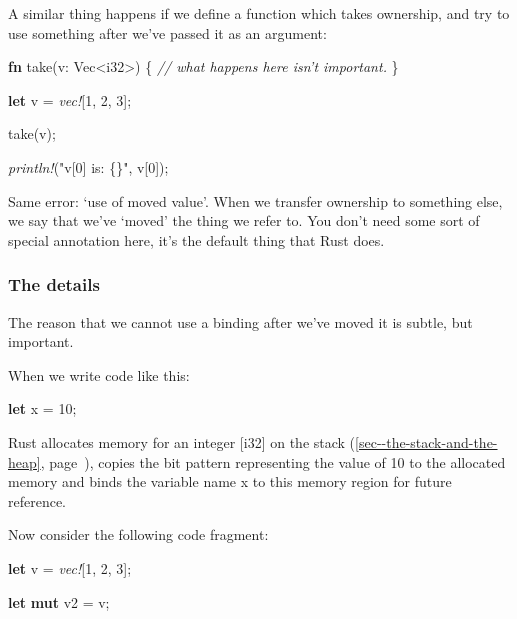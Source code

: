 \documentclass[a4paper,]{book}
\renewcommand*{\hyperlink}[2]{%
 #2 (\autoref{#1}, page~\pageref{#1})}
\newenvironment{Shaded}{\begin{snugshade}}{\end{snugshade}}
\newcommand{\KeywordTok}[1]{\textcolor[rgb]{0.13,0.29,0.53}{\textbf{{#1}}}}
\newcommand{\DataTypeTok}[1]{\textcolor[rgb]{0.13,0.29,0.53}{{#1}}}
\newcommand{\DecValTok}[1]{\textcolor[rgb]{0.00,0.00,0.81}{{#1}}}
\newcommand{\StringTok}[1]{\textcolor[rgb]{0.31,0.60,0.02}{{#1}}}
\newcommand{\CommentTok}[1]{\textcolor[rgb]{0.56,0.35,0.01}{\textit{{#1}}}}
\newcommand{\PreprocessorTok}[1]{\textcolor[rgb]{0.56,0.35,0.01}{\textit{{#1}}}}
\newcommand{\NormalTok}[1]{{#1}}
\begin{document}
A similar thing happens if we define a function which takes ownership,
and try to use something after we've passed it as an argument:

\begin{Shaded}
\begin{Highlighting}[]
\KeywordTok{fn} \NormalTok{take(v: }\DataTypeTok{Vec}\NormalTok{<}\DataTypeTok{i32}\NormalTok{>) \{}
    \CommentTok{// what happens here isn’t important.}
\NormalTok{\}}

\KeywordTok{let} \NormalTok{v = }\PreprocessorTok{vec!}\NormalTok{[}\DecValTok{1}\NormalTok{, }\DecValTok{2}\NormalTok{, }\DecValTok{3}\NormalTok{];}

\NormalTok{take(v);}

\PreprocessorTok{println!}\NormalTok{(}\StringTok{"v[0] is: \{\}"}\NormalTok{, v[}\DecValTok{0}\NormalTok{]);}
\end{Highlighting}
\end{Shaded}

Same error: `use of moved value'. When we transfer ownership to
something else, we say that we've `moved' the thing we refer to. You
don't need some sort of special annotation here, it's the default thing
that Rust does.

\subsubsection{The details}\label{the-details}

The reason that we cannot use a binding after we've moved it is subtle,
but important.

When we write code like this:

\begin{Shaded}
\begin{Highlighting}[]
\KeywordTok{let} \NormalTok{x = }\DecValTok{10}\NormalTok{;}
\end{Highlighting}
\end{Shaded}

Rust allocates memory for an integer {[}i32{]} on the
\protect\hyperlink{sec--the-stack-and-the-heap}{stack}, copies the bit
pattern representing the value of 10 to the allocated memory and binds
the variable name x to this memory region for future reference.

Now consider the following code fragment:

\begin{Shaded}
\begin{Highlighting}[]
\KeywordTok{let} \NormalTok{v = }\PreprocessorTok{vec!}\NormalTok{[}\DecValTok{1}\NormalTok{, }\DecValTok{2}\NormalTok{, }\DecValTok{3}\NormalTok{];}

\KeywordTok{let} \KeywordTok{mut} \NormalTok{v2 = v;}
\end{Highlighting}
\end{Shaded}
\end{document}

